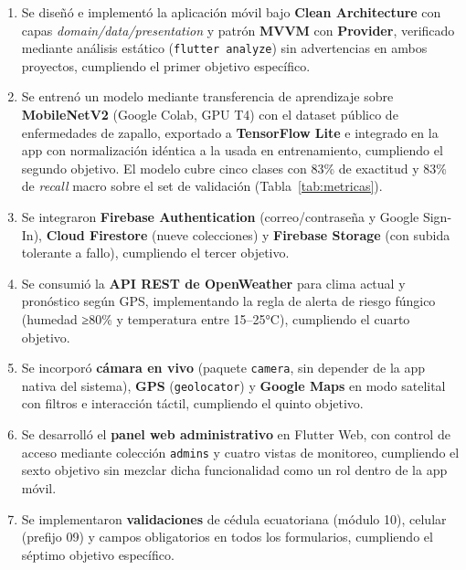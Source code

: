 \documentclass[12pt,a4paper]{article}
\begin{document}
\begin{enumerate}
  \item Se diseñó e implementó la aplicación móvil bajo \textbf{Clean
        Architecture} con capas \textit{domain/data/presentation} y patrón
        \textbf{MVVM} con \textbf{Provider}, verificado mediante análisis
        estático (\texttt{flutter analyze}) sin advertencias en ambos
        proyectos, cumpliendo el primer objetivo específico.

  \item Se entrenó un modelo mediante transferencia de aprendizaje sobre
        \textbf{MobileNetV2} (Google Colab, GPU T4) con el dataset público de
        enfermedades de zapallo, exportado a \textbf{TensorFlow Lite} e
        integrado en la app con normalización idéntica a la usada en
        entrenamiento, cumpliendo el segundo objetivo. El modelo cubre cinco
        clases con 83\% de exactitud y 83\% de \textit{recall} macro sobre el
        set de validación (Tabla~\ref{tab:metricas}).

  \item Se integraron \textbf{Firebase Authentication} (correo/contraseña y
        Google Sign-In), \textbf{Cloud Firestore} (nueve colecciones) y
        \textbf{Firebase Storage} (con subida tolerante a fallo), cumpliendo el
        tercer objetivo.

  \item Se consumió la \textbf{API REST de OpenWeather} para clima actual y
        pronóstico según GPS, implementando la regla de alerta de riesgo
        fúngico (humedad ≥80\% y temperatura entre 15--25°C), cumpliendo el
        cuarto objetivo.

  \item Se incorporó \textbf{cámara en vivo} (paquete \texttt{camera}, sin
        depender de la app nativa del sistema), \textbf{GPS} (\texttt{geolocator})
        y \textbf{Google Maps} en modo satelital con filtros e interacción
        táctil, cumpliendo el quinto objetivo.

  \item Se desarrolló el \textbf{panel web administrativo} en Flutter Web,
        con control de acceso mediante colección \texttt{admins} y cuatro
        vistas de monitoreo, cumpliendo el sexto objetivo sin mezclar dicha
        funcionalidad como un rol dentro de la app móvil.

  \item Se implementaron \textbf{validaciones} de cédula ecuatoriana (módulo
        10), celular (prefijo 09) y campos obligatorios en todos los
        formularios, cumpliendo el séptimo objetivo específico.
\end{enumerate}
\end{document}
